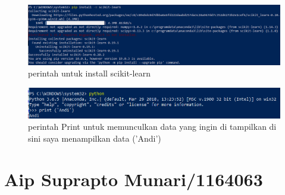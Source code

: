 \begin{figure} [ht]
\centering 
\includegraphics[scale=1] {figures/4.png}
\caption{perintah untuk install scikit-learn }
\label{proses instalasi}
\end{figure}

\begin{figure} [ht]
\centering 
\includegraphics[scale=1] {figures/5.png}
\caption{perintah Print untuk memunculkan data yang ingin di tampilkan di sini saya menampilkan data ('Andi') }
\label{proses instalasi}
\end{figure}

\section{Aip Suprapto Munari/1164063}
